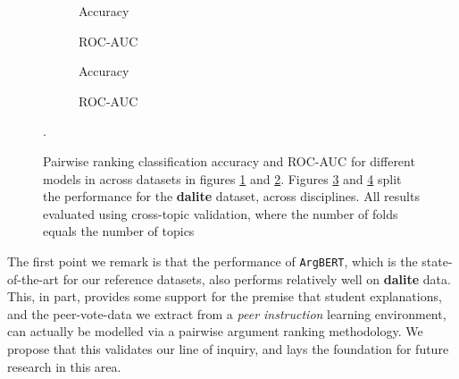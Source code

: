 \documentclass[runningheads]{llncs}
\begin{document}
\begin{figure}
	\begin{subfigure}[t]{0.5\linewidth}
		\centering
		\scalebox{0.5}{}
		\caption{Accuracy}
		\label{fig:acc_cross_topic}
	\end{subfigure}%
	\qquad
	\begin{subfigure}[t]{0.5\linewidth}
		\centering
		\scalebox{0.5}{}
		\caption{ROC-AUC}
		\label{fig:AUC_cross_topic}
	\end{subfigure}
	\begin{subfigure}[t]{0.5\linewidth}
		\centering
		\scalebox{0.5}{}
		\caption{Accuracy}
		\label{fig:acc_dalite_cross_topic}
	\end{subfigure}%
	\qquad
	\begin{subfigure}[t]{0.5\linewidth}
		\centering
		\scalebox{0.5}{}
		\caption{ROC-AUC}
		\label{fig:AUC_dalite_cross_topic}
	\end{subfigure}
	\caption{Pairwise ranking classification accuracy and ROC-AUC for 
		different models in across datasets in figures 
		\ref{fig:acc_cross_topic} 
		and \ref{fig:AUC_cross_topic}. Figures \ref{fig:acc_dalite_cross_topic} 
		and 
		\ref{fig:AUC_dalite_cross_topic} split the performance for the 
		\textbf{dalite} dataset, across disciplines. All results evaluated 
		using 
		cross-topic validation, where the number of folds equals the number of 
		topics}.
	\label{fig:performance_cross_topic}
	
\end{figure}
The first point we remark is that the performance of \verb|ArgBERT|, which is 
the state-of-the-art for our reference datasets, also performs relatively well 
on \textbf{dalite} data.
This, in part, provides some support for the premise that student explanations, 
and the peer-vote-data we extract from a \textit{peer instruction} learning 
environment, can actually be modelled via a pairwise argument ranking 
methodology.
We propose that this validates our line of inquiry, and lays the foundation 
for future research in this area.
\end{document}

